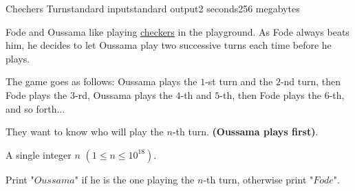 \begin{problem}{Chechers Turn}{standard input}{standard output}{2 seconds}{256 megabytes}

Fode and Oussama like playing \href{https://en.wikipedia.org/wiki/Checkers}{checkers} in the playground. As Fode always beats him, he decides to let Oussama play two successive turns each time before he plays.

The game goes as follows: Oussama plays the $1$-st turn and the $2$-nd turn, then Fode plays the $3$-rd, Oussama plays the $4$-th and $5$-th, then Fode plays the $6$-th, and so forth...

They want to know who will play the $n$-th turn. \textbf{(Oussama plays first)}.

\InputFile
A single integer $n$ $(1 \leq n \leq 10^{18})$.

\OutputFile
Print "$Oussama$" if he is the one playing the $n$-th turn, otherwise print "$Fode$".

\Examples

\begin{example}
%
%
\end{example}

\end{problem}

